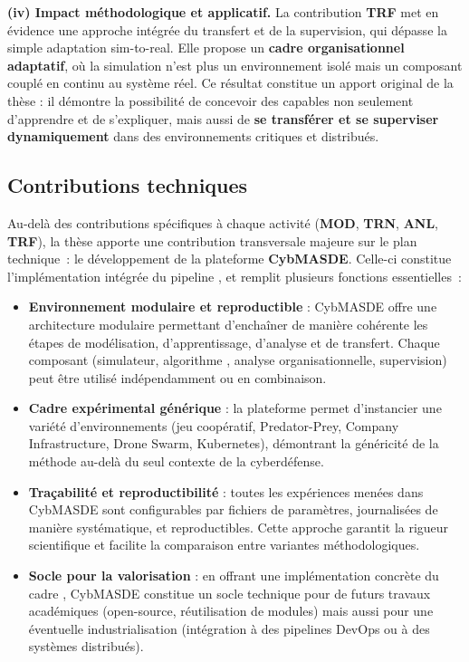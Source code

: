 \medskip
\noindent
\textbf{(iv) Impact méthodologique et applicatif.}
La contribution \textbf{TRF} met en évidence une approche intégrée du transfert et de la supervision, qui dépasse la simple adaptation sim-to-real.
Elle propose un \textbf{cadre organisationnel adaptatif}, où la simulation n’est plus un environnement isolé mais un composant couplé en continu au système réel.
Ce résultat constitue un apport original de la thèse : il démontre la possibilité de concevoir des  capables non seulement d’apprendre et de s’expliquer, mais aussi de \textbf{se transférer et se superviser dynamiquement} dans des environnements critiques et distribués.

\subsection*{Contributions techniques}

Au-delà des contributions spécifiques à chaque activité (\textbf{MOD}, \textbf{TRN}, \textbf{ANL}, \textbf{TRF}), la thèse apporte une contribution transversale majeure sur le plan technique~: le développement de la plateforme \textbf{CybMASDE}.
Celle-ci constitue l’implémentation intégrée du pipeline , et remplit plusieurs fonctions essentielles~:

\begin{itemize}
  \item \textbf{Environnement modulaire et reproductible} : CybMASDE offre une architecture modulaire permettant d’enchaîner de manière cohérente les étapes de modélisation, d’apprentissage, d’analyse et de transfert. Chaque composant (simulateur, algorithme , analyse organisationnelle, supervision) peut être utilisé indépendamment ou en combinaison.
  \item \textbf{Cadre expérimental générique} : la plateforme permet d’instancier une variété d’environnements (jeu coopératif, Predator-Prey, Company Infrastructure, Drone Swarm, Kubernetes), démontrant la généricité de la méthode au-delà du seul contexte de la cyberdéfense.
  \item \textbf{Traçabilité et reproductibilité} : toutes les expériences menées dans CybMASDE sont configurables par fichiers de paramètres, journalisées de manière systématique, et reproductibles. Cette approche garantit la rigueur scientifique et facilite la comparaison entre variantes méthodologiques.
  \item \textbf{Socle pour la valorisation} : en offrant une implémentation concrète du cadre , CybMASDE constitue un socle technique pour de futurs travaux académiques (open-source, réutilisation de modules) mais aussi pour une éventuelle industrialisation (intégration à des pipelines DevOps ou à des systèmes distribués).
\end{itemize}

